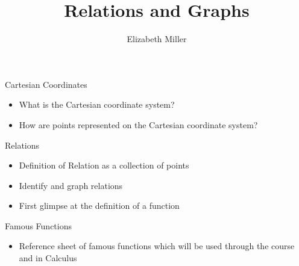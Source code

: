 \documentclass{ximera}
\author{Elizabeth Miller}
\title{Relations and Graphs}
\begin{document}
\begin{abstract}
\end{abstract}
\maketitle


\begin{objectives}

\item Cartesian Coordinates
\begin{itemize}
	\item What is the Cartesian coordinate system?
	\item How are points represented on the Cartesian coordinate system?
\end{itemize}

\item Relations
\begin{itemize}
	\item Definition of Relation as a collection of points 
	\item Identify and graph relations
	\item First glimpse at the definition of a function
\end{itemize}

\item Famous Functions
\begin{itemize}
	\item Reference sheet of famous functions which will be used through the course and in Calculus
\end{itemize}

\end{objectives}
\end{document}
